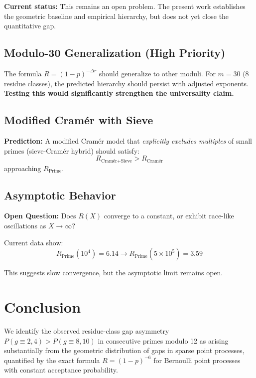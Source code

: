 \documentclass[11pt,a4paper]{article}
\theoremstyle{definition}
\theoremstyle{remark}
\begin{document}
\textbf{Current status:} This remains an open problem. The present work establishes the geometric baseline and empirical hierarchy, but does not yet close the quantitative gap.

\subsection{Modulo-30 Generalization (High Priority)}

The formula $R = (1-p)^{-\Delta r}$ should generalize to other moduli. For $m=30$ (8 residue classes), the predicted hierarchy should persist with adjusted exponents. \textbf{Testing this would significantly strengthen the universality claim.}

\subsection{Modified Cramér with Sieve}

\textbf{Prediction:} A modified Cramér model that \emph{explicitly excludes multiples} of small primes (sieve-Cramér hybrid) should satisfy:
\begin{equation}
R_{\text{Cramér+Sieve}} > R_{\text{Cramér}}
\end{equation}
approaching $R_{\text{Prime}}$.

\subsection{Asymptotic Behavior}

\textbf{Open Question:} Does $R(X)$ converge to a constant, or exhibit race-like oscillations as $X \to \infty$?

Current data show:
\begin{equation}
R_{\text{Prime}}(10^4) = 6.14 \to R_{\text{Prime}}(5 \times 10^5) = 3.59
\end{equation}

This suggests slow convergence, but the asymptotic limit remains open.

\section{Conclusion}

We identify the observed residue-class gap asymmetry $P(g \equiv 2,4) > P(g \equiv 8,10)$ in consecutive primes modulo 12 as arising substantially from the geometric distribution of gaps in sparse point processes, quantified by the exact formula $R = (1-p)^{-6}$ for Bernoulli point processes with constant acceptance probability.
\end{document}
